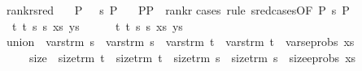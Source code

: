 \begin{isabellebody}
\endisatagproof
{\isafoldproof}%
%
\isadelimproof
\isanewline
%
\endisadelimproof
\isanewline
{}\isamarkupfalse%
\ rank{\isacharunderscore}{\kern0pt}r{\isacharunderscore}{\kern0pt}sred{\isacharcolon}{\kern0pt}\isanewline
\ \ \ {\isachardoublequoteopen}P{}\ {\isasymturnstile}\ \ s\ {\isasymleadsto}P{}{\isachardoublequoteclose}\isanewline
\ \ \ {\isachardoublequoteopen}{\isacharparenleft}{\kern0pt}P{}{\isacharcomma}{\kern0pt}P{}{\isacharparenright}{\kern0pt}\ {\isasymin}\ rank{\isacharunderscore}{\kern0pt}r{\isachardoublequoteclose}\isanewline
%
\isadelimproof
%
\endisadelimproof
%
\isatagproof
{}\isamarkupfalse%
{\isacharparenleft}{\kern0pt}cases\ rule{\isacharcolon}{\kern0pt}\ s{\isacharunderscore}{\kern0pt}red{\isachardot}{\kern0pt}cases{\isacharbrackleft}{\kern0pt}OF\ {\isacartoucheopen}P{}{\isasymturnstile}\ s\ {\isasymleadsto}P{}{\isacartoucheclose}{\isacharbrackright}{\kern0pt}{\isacharparenright}{\kern0pt}\isanewline
\ \ \isamarkupfalse%
\ {\isacharparenleft}{\kern0pt}{}\ t{}\ t{}\ s{}\ s{}\ xs\ ys{\isacharparenright}{\kern0pt}\isanewline
\ \ \ \isamarkupfalse%
\ {\isacharparenleft}{\kern0pt}{}\ t{}\ t{}\ s{}\ s{}\ xs\ ys{\isacharparenright}{\kern0pt}\isanewline
\ \ \isamarkupfalse%
\ {\isacharquery}{\kern0pt}union\ {\isacharequal}{\kern0pt}\ {\isachardoublequoteopen}vars{\isacharunderscore}{\kern0pt}trm\ s{}\ {\isasymunion}\ vars{\isacharunderscore}{\kern0pt}trm\ s{}\ {\isasymunion}\ vars{\isacharunderscore}{\kern0pt}trm\ t{}\ {\isasymunion}\ vars{\isacharunderscore}{\kern0pt}trm\ t{}\ {\isasymunion}\ vars{\isacharunderscore}{\kern0pt}eprobs\ xs{\isachardoublequoteclose}\isanewline
\ \ \ \ \ {\isacharquery}{\kern0pt}size\ {\isacharequal}{\kern0pt}\ {\isachardoublequoteopen}size{\isacharunderscore}{\kern0pt}trm\ t{}\ {\isacharplus}{\kern0pt}\ size{\isacharunderscore}{\kern0pt}trm\ t{}\ {\isacharplus}{\kern0pt}\ size{\isacharunderscore}{\kern0pt}trm\ s{}\ {\isacharplus}{\kern0pt}\ size{\isacharunderscore}{\kern0pt}trm\ s{}\ {\isacharplus}{\kern0pt}\ size{\isacharunderscore}{\kern0pt}eprobs\ xs{\isachardoublequoteclose}\isanewline
\ \ \isamarkupfalse%
\ {}\ \isamarkupfalse%

\end{isabellebody}
